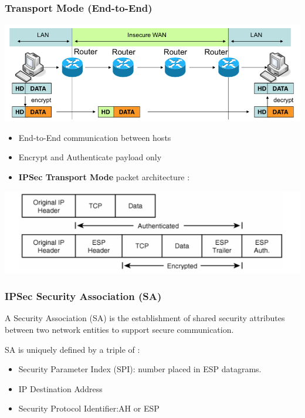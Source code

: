 \documentclass[english, leagacyboxes, nologo]{latex4ei/latex4ei_sheet}
\begin{document}
{    \subsubsection{Transport Mode (End-to-End)}
      \includegraphics[width=\columnwidth]{img/vpntransport.png}

      \begin{itemize}
        \item End-to-End communication between hosts
        \item Encrypt and Authenticate payload only
        \item \textbf{IPSec Transport Mode} packet architecture :
      \end{itemize}

      \includegraphics[width=\columnwidth]{img/vpntransport2.png}

    \subsubsection{IPSec Security Association (SA)}
      A Security Association (SA) is the establishment of shared security attributes between two network entities to support secure communication.

      SA is uniquely defined by a triple of :
      \begin{itemize}
        \item Security Parameter Index (SPI): number placed in ESP datagrams.
        \item IP Destination Address
        \item Security Protocol Identifier:AH or ESP
      \end{itemize}
  }
\end{document}

